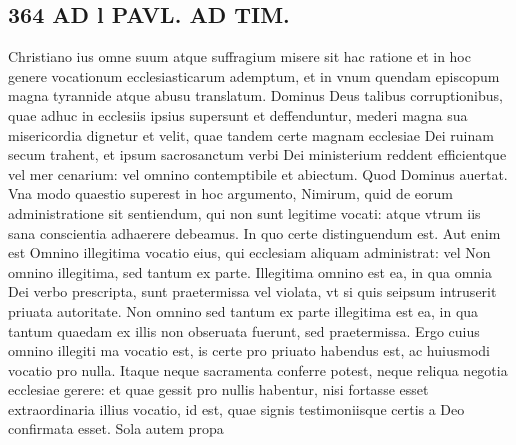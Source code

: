 \documentclass{article}
\begin{document}
\begin{pages}
\section*{364 AD l PAVL. AD TIM. }\pstart Christiano ius omne suum atque suffragium misere sit hac ratione et in hoc genere vocationum ecclesiasticarum ademptum, et in vnum quendam episcopum magna tyrannide atque abusu translatum. Dominus Deus talibus corruptionibus, quae adhuc in ecclesiis ipsius supersunt et deffenduntur, mederi magna sua misericordia dignetur et velit, quae tandem certe magnam ecclesiae Dei ruinam secum trahent, et ipsum sacrosanctum verbi Dei ministerium reddent efficientque vel mer cenarium: vel omnino contemptibile et abiectum. Quod Dominus auertat. Vna modo quaestio superest in hoc argumento, Nimirum, quid de eorum administratione sit sentiendum, qui non sunt legitime vocati: atque vtrum iis sana conscientia adhaerere debeamus. In quo certe distinguendum est. Aut enim est Omnino illegitima vocatio eius, qui ecclesiam aliquam administrat: vel Non omnino illegitima, sed tantum ex parte. Illegitima omnino est ea, in qua omnia Dei verbo prescripta, sunt praetermissa vel violata, vt si quis seipsum intruserit priuata autoritate. Non omnino sed tantum ex parte illegitima est ea, in qua tantum quaedam ex illis non obseruata fuerunt, sed praetermissa. Ergo cuius omnino illegiti ma vocatio est, is certe pro priuato habendus est, ac huiusmodi vocatio pro nulla. Itaque neque sacramenta conferre potest, neque reliqua negotia ecclesiae gerere: et quae gessit pro nullis habentur, nisi fortasse esset extraordinaria illius vocatio, id est, quae signis testimoniisque certis a Deo confirmata esset. Sola autem propa\pend

\end{pages}
\end{document}
